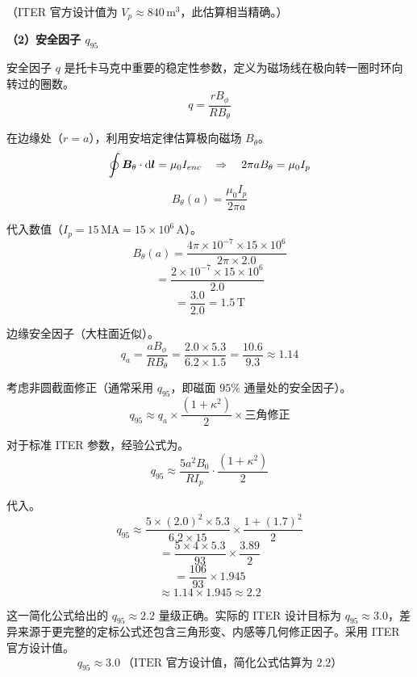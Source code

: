 （ITER 官方设计值为 $V_p \approx 840\,\mathrm{m^3}$，此估算相当精确。）

\textbf{（2）安全因子 $q_{95}$}

安全因子 $q$ 是托卡马克中重要的稳定性参数，定义为磁场线在极向转一圈时环向转过的圈数。
\begin{equation}
    q = \frac{r B_{\phi}}{R B_{\theta}}
\label{eq:ch10-safety-factor}
\end{equation}

在边缘处（$r=a$），利用安培定律估算极向磁场 $B_{\theta}$。
\begin{equation}
    \oint \bm{B}_{\theta}\cdot\mathrm{d}\bm{l} = \mu_0 I_{enc} \quad\Rightarrow\quad 2\pi a B_{\theta} = \mu_0 I_p
\label{eq:ch10-ampere-law}
\end{equation}
\begin{equation}
    B_{\theta}(a) = \frac{\mu_0 I_p}{2\pi a}
\label{eq:ch10-poloidal-field}
\end{equation}

代入数值（$I_p=15\,\mathrm{MA}=15\times10^6\,\mathrm{A}$）。
\[
    B_{\theta}(a) = \frac{4\pi\times10^{-7}\times15\times10^6}{2\pi\times2.0}
\]
\[
    = \frac{2\times10^{-7}\times15\times10^6}{2.0}
\]
\[
    = \frac{3.0}{2.0} = 1.5\,\mathrm{T}
\]

边缘安全因子（大柱面近似）。
\[
    q_a = \frac{a B_{\phi}}{R B_{\theta}} = \frac{2.0\times5.3}{6.2\times1.5} = \frac{10.6}{9.3} \approx 1.14
\]

考虑非圆截面修正（通常采用 $q_{95}$，即磁面 $95\%$ 通量处的安全因子）。
\begin{equation}
    q_{95} \approx q_a \times \frac{(1+\kappa^2)}{2} \times \text{三角修正}
\label{eq:ch10-q95-approx}
\end{equation}

对于标准 ITER 参数，经验公式为。
\begin{equation}
    q_{95} \approx \frac{5 a^2 B_0}{R I_p} \cdot \frac{(1+\kappa^2)}{2}
\label{eq:ch10-q95-empirical}
\end{equation}

代入。
\[
    q_{95} \approx \frac{5\times(2.0)^2\times5.3}{6.2\times15} \times \frac{1+(1.7)^2}{2}
\]
\[
    = \frac{5\times4\times5.3}{93} \times \frac{3.89}{2}
\]
\[
    = \frac{106}{93} \times 1.945
\]
\[
    \approx 1.14 \times 1.945 \approx 2.2
\]

这一简化公式给出的 $q_{95}\approx 2.2$ 量级正确。实际的 ITER 设计目标为 $q_{95}\approx 3.0$，差异来源于更完整的定标公式还包含三角形变、内感等几何修正因子。采用 ITER 官方设计值。
\[
    \boxed{q_{95} \approx 3.0\ \text{（ITER 官方设计值，简化公式估算为 2.2）}}
\]


